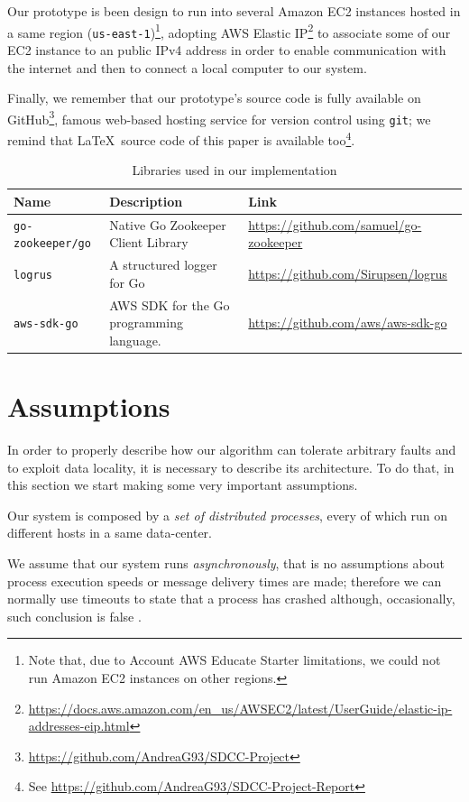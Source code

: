 \documentclass[sigchi]{acmart}
\begin{document}
Our prototype is been design to run into several Amazon EC2 instances hosted in a same region (\texttt{us-east-1})\footnote{Note that, due to Account AWS Educate Starter limitations, we could not run Amazon EC2 instances on other regions.}, adopting AWS Elastic IP\footnote{\url{https://docs.aws.amazon.com/en_us/AWSEC2/latest/UserGuide/elastic-ip-addresses-eip.html}} to associate some of our EC2 instance to an public IPv4 address in order to enable communication with the internet and then to connect a local computer to our system. 

Finally, we remember that our prototype's source code is fully available on GitHub\footnote{\url{https://github.com/AndreaG93/SDCC-Project}}, famous web-based hosting service for version control using \texttt{git}; we remind that \LaTeX\ source code of this paper is available too\footnote{See \url{https://github.com/AndreaG93/SDCC-Project-Report}}.  


\begin{table}
  \caption{Libraries used in our implementation}
  \label{tab:libraries}
  \begin{tabular}{l|l|l}
    \toprule
    Name & Description & Link \\
    \midrule
    \texttt{go-zookeeper/go} & Native Go Zookeeper Client Library & \url{https://github.com/samuel/go-zookeeper} \\
    \texttt{logrus} & A structured logger for Go & \url{https://github.com/Sirupsen/logrus} \\
    \texttt{aws-sdk-go} & AWS SDK for the Go programming language. & \url{https://github.com/aws/aws-sdk-go} \\
    \bottomrule
  \end{tabular}
\end{table}

\section{Assumptions}

In order to properly describe how our algorithm can tolerate arbitrary faults and to exploit data locality, it is necessary to describe its architecture. To do that, in this section we start making some very important assumptions.

Our system is composed by a \textit{set of distributed processes}, every of which run on different hosts in a same data-center.

We assume that our system runs \textit{asynchronously}, that is no assumptions about process execution speeds or message delivery times are made; therefore we can normally use timeouts to state that a process has crashed although, occasionally, such conclusion is false \cite{SDCC}.
\end{document}
